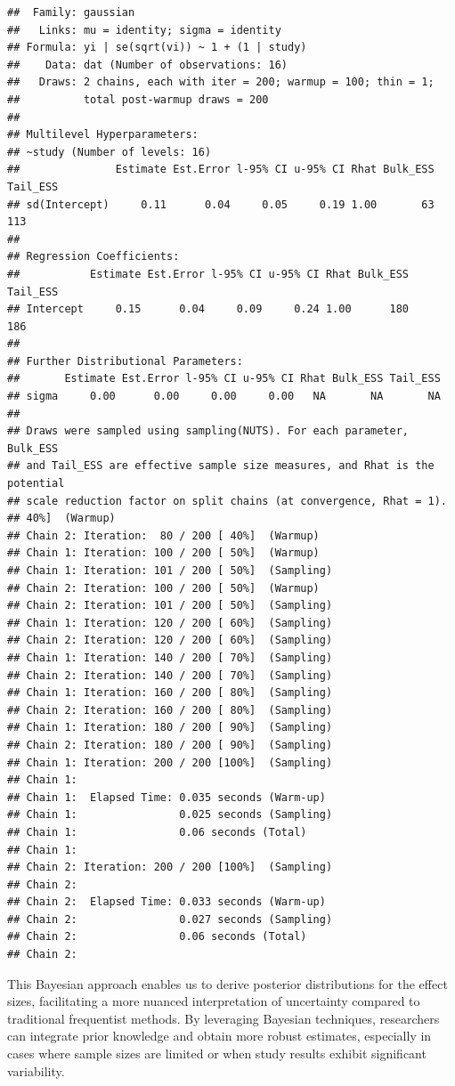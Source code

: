 \documentclass[
]{book}
\begin{document}
\begin{verbatim}
##  Family: gaussian 
##   Links: mu = identity; sigma = identity 
## Formula: yi | se(sqrt(vi)) ~ 1 + (1 | study) 
##    Data: dat (Number of observations: 16) 
##   Draws: 2 chains, each with iter = 200; warmup = 100; thin = 1;
##          total post-warmup draws = 200
## 
## Multilevel Hyperparameters:
## ~study (Number of levels: 16) 
##               Estimate Est.Error l-95% CI u-95% CI Rhat Bulk_ESS Tail_ESS
## sd(Intercept)     0.11      0.04     0.05     0.19 1.00       63      113
## 
## Regression Coefficients:
##           Estimate Est.Error l-95% CI u-95% CI Rhat Bulk_ESS Tail_ESS
## Intercept     0.15      0.04     0.09     0.24 1.00      180      186
## 
## Further Distributional Parameters:
##       Estimate Est.Error l-95% CI u-95% CI Rhat Bulk_ESS Tail_ESS
## sigma     0.00      0.00     0.00     0.00   NA       NA       NA
## 
## Draws were sampled using sampling(NUTS). For each parameter, Bulk_ESS
## and Tail_ESS are effective sample size measures, and Rhat is the potential
## scale reduction factor on split chains (at convergence, Rhat = 1).
## 40%]  (Warmup)
## Chain 2: Iteration:  80 / 200 [ 40%]  (Warmup)
## Chain 1: Iteration: 100 / 200 [ 50%]  (Warmup)
## Chain 1: Iteration: 101 / 200 [ 50%]  (Sampling)
## Chain 2: Iteration: 100 / 200 [ 50%]  (Warmup)
## Chain 2: Iteration: 101 / 200 [ 50%]  (Sampling)
## Chain 1: Iteration: 120 / 200 [ 60%]  (Sampling)
## Chain 2: Iteration: 120 / 200 [ 60%]  (Sampling)
## Chain 1: Iteration: 140 / 200 [ 70%]  (Sampling)
## Chain 2: Iteration: 140 / 200 [ 70%]  (Sampling)
## Chain 1: Iteration: 160 / 200 [ 80%]  (Sampling)
## Chain 2: Iteration: 160 / 200 [ 80%]  (Sampling)
## Chain 1: Iteration: 180 / 200 [ 90%]  (Sampling)
## Chain 2: Iteration: 180 / 200 [ 90%]  (Sampling)
## Chain 1: Iteration: 200 / 200 [100%]  (Sampling)
## Chain 1: 
## Chain 1:  Elapsed Time: 0.035 seconds (Warm-up)
## Chain 1:                0.025 seconds (Sampling)
## Chain 1:                0.06 seconds (Total)
## Chain 1: 
## Chain 2: Iteration: 200 / 200 [100%]  (Sampling)
## Chain 2: 
## Chain 2:  Elapsed Time: 0.033 seconds (Warm-up)
## Chain 2:                0.027 seconds (Sampling)
## Chain 2:                0.06 seconds (Total)
## Chain 2:
\end{verbatim}

This Bayesian approach enables us to derive posterior distributions for the effect sizes, facilitating a more nuanced interpretation of uncertainty compared to traditional frequentist methods. By leveraging Bayesian techniques, researchers can integrate prior knowledge and obtain more robust estimates, especially in cases where sample sizes are limited or when study results exhibit significant variability.
\end{document}
